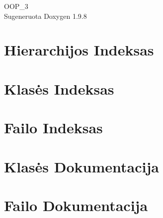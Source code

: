 \documentclass[twoside]{book}
\newcommand{\+}{\discretionary{\mbox{\scriptsize$\hookleftarrow$}}{}{}}
\newcommand{\clearemptydoublepage}{%
    \newpage{\pagestyle{empty}\cleardoublepage}%
  }
\begin{document}
  \raggedbottom
    \hypersetup{pageanchor=false,
                bookmarksnumbered=true,
                pdfencoding=unicode
               }
  \begin{titlepage}
  \vspace*{7cm}
  \begin{center}%
  {\Large OOP\+\_\+3}\\
  \vspace*{1cm}
  {\large Sugeneruota Doxygen 1.9.8}\\
  \end{center}
  \end{titlepage}
  \clearemptydoublepage
  \tableofcontents
  \clearemptydoublepage
  \hypersetup{pageanchor=true}
\chapter{Hierarchijos Indeksas}

\chapter{Klasės Indeksas}

\chapter{Failo Indeksas}

\chapter{Klasės Dokumentacija}



\chapter{Failo Dokumentacija}











  \backmatter
  \newpage
  \clearemptydoublepage
  \printindex
\end{document}
